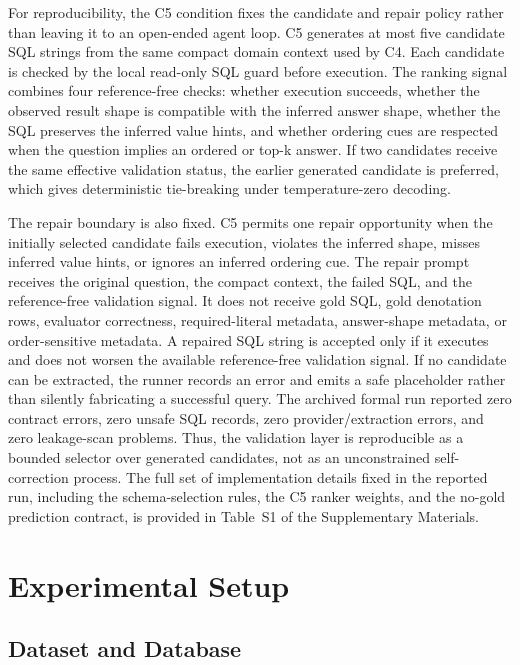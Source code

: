 \documentclass[cmc,article,submit,moreauthors,pdftex]{Definitions/tsp}
\begin{document}
For reproducibility, the C5 condition fixes the candidate and repair policy rather than leaving it to an open-ended agent loop. C5 generates at most five candidate SQL strings from the same compact domain context used by C4. Each candidate is checked by the local read-only SQL guard before execution. The ranking signal combines four reference-free checks: whether execution succeeds, whether the observed result shape is compatible with the inferred answer shape, whether the SQL preserves the inferred value hints, and whether ordering cues are respected when the question implies an ordered or top-k answer. If two candidates receive the same effective validation status, the earlier generated candidate is preferred, which gives deterministic tie-breaking under temperature-zero decoding.

The repair boundary is also fixed. C5 permits one repair opportunity when the initially selected candidate fails execution, violates the inferred shape, misses inferred value hints, or ignores an inferred ordering cue. The repair prompt receives the original question, the compact context, the failed SQL, and the reference-free validation signal. It does not receive gold SQL, gold denotation rows, evaluator correctness, required-literal metadata, answer-shape metadata, or order-sensitive metadata. A repaired SQL string is accepted only if it executes and does not worsen the available reference-free validation signal. If no candidate can be extracted, the runner records an error and emits a safe placeholder rather than silently fabricating a successful query. The archived formal run reported zero contract errors, zero unsafe SQL records, zero provider/extraction errors, and zero leakage-scan problems. Thus, the validation layer is reproducible as a bounded selector over generated candidates, not as an unconstrained self-correction process. The full set of implementation details fixed in the reported run, including the schema-selection rules, the C5 ranker weights, and the no-gold prediction contract, is provided in Table~S1 of the Supplementary Materials.

\section{Experimental Setup}\label{experiments}

\subsection{Dataset and Database}\label{sect:e1}
\end{document}
